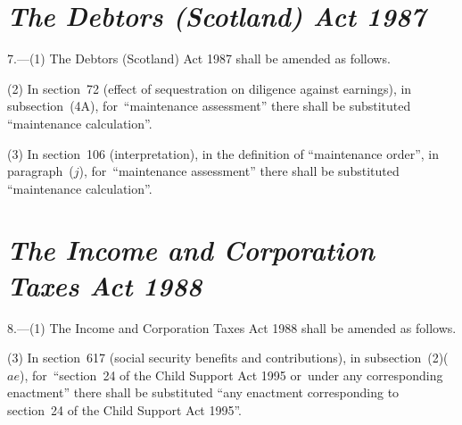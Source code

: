 \documentclass[12pt,a4paper]{article}
\begin{document}
\section*{\itshape The Debtors (Scotland) Act 1987}

7.---(1) The Debtors (Scotland) Act 1987 shall be amended as follows.

(2) In section~72 (effect of sequestration on diligence against earnings), in subsection~(4A), for~“maintenance assessment” there shall be substituted “maintenance calculation”.

(3) In section~106 (interpretation), in the definition of “maintenance order”, in paragraph~($j$), for~“maintenance assessment” there shall be substituted “maintenance calculation”.


\section*{\itshape The Income and Corporation Taxes Act 1988}

8.---(1) The Income and Corporation Taxes Act 1988 shall be amended as follows.

%
%

(3) In section~617 (social security benefits and contributions), in subsection~(2)($ae$), for~“section~24 of the Child Support Act 1995 or~under any corresponding enactment” there shall be substituted “any enactment corresponding to section~24 of the Child Support Act 1995”.
\end{document}
